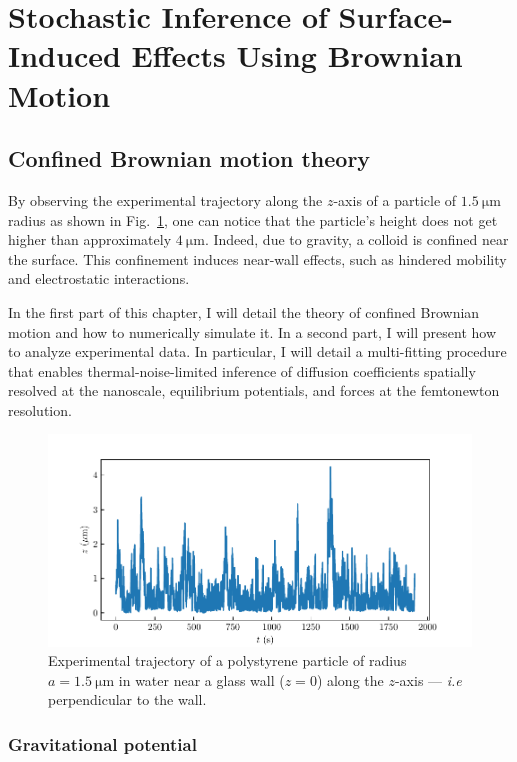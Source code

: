\section{Stochastic Inference of Surface-Induced Effects Using Brownian Motion}

\subsection{Confined Brownian motion theory}
\label{sec:confined}
By observing the experimental trajectory along the $z$-axis of a particle of $1.5 ~ \mathrm{\mu m} $ radius as shown in Fig.~\ref{Fig:exp_z_traj}, one can notice that the particle's height does not get higher than approximately $4 ~ \mathrm{\mu m}$. Indeed, due to gravity, a colloid is confined near the surface. This confinement induces near-wall effects, such as hindered mobility and electrostatic interactions. 

In the first part of this chapter, I will detail the theory of confined Brownian motion and how to numerically simulate it. In a second part, I will present how to analyze experimental data. In particular, I will detail a multi-fitting procedure that enables thermal-noise-limited inference of diffusion coefficients spatially resolved at the nanoscale, equilibrium potentials, and forces at the femtonewton resolution.

\begin{figure}[ht]
	\centering
	\includegraphics{02_body/chapter3/images/traj_z/traj_z.pdf}
	\caption{Experimental trajectory of a polystyrene particle of radius $a = 1.5 ~ \mathrm{\mu m}$ in water near a glass wall ($z = 0$) along the $z$-axis --- \textit{i.e} perpendicular to the wall.}
	\label{Fig:exp_z_traj}
\end{figure}

\subsubsection{Gravitational potential}
\label{sec:gravit}


